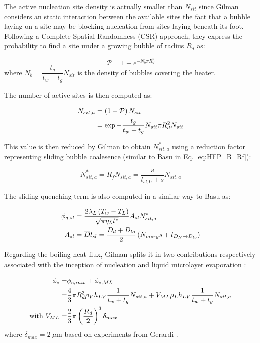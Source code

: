 The active nucleation site density is actually smaller than $N_{sit}$ since Gilman considers an static interaction between the available sites \ie the fact that a bubble laying on a site may be blocking nucleation from sites laying beneath its foot. Following a Complete Spatial Randomness (CSR) approach, they express the probability to find a site under a growing bubble of radius $R_{d}$ as:

\begin{equation}
\mathcal{P} = 1-e^{-N_{b}\pi R_{d}^{2}}
\label{eq:HFP_G_Pinter}
\end{equation} 
where $N_{b} = \dfrac{t_{g}}{t_{w}+t_{g}}N_{sit}$ is the density of bubbles covering the heater.

The number of active sites is then computed as:

\begin{align}
N_{sit,a} &= \parth{1-\mathcal{P}}N_{sit}\\
%
&= \exp{-\dfrac{t_{g}}{t_{w}+t_{g}}N_{sit}\pi R_{d}^{2}} N_{sit}
\label{eq:HFP_G_Nsita}
\end{align}

This value is then reduced by Gilman to obtain $N_{sit,a}^{*}$ using a reduction factor representing sliding bubble coalesence (similar to Basu in Eq. \ref{eq:HFP_B_Rf}):

\begin{equation}
N_{sit,a}^{*}=R_{f}N_{sit,a} = \frac{s}{l_{sl,0}+s} N_{sit,a}
\end{equation}


The sliding quenching term is also computed in a similar way to Basu as:

\begin{align}
\phi_{q,sl}&=\frac{2\lambda_{L}\parth{T_{w}-T_{L}}}{\sqrt{\pi \eta_{L}t^{*}}}A_{sl}N_{sit,a}^{*} \\
%
A_{sl} &= \overline{D}l_{sl} = \frac{D_{d}+D_{lo}}{2}\parth{N_{merg}s+l_{D_{N}\rightarrow D_{lo}}}
\end{align}

Regarding the boiling heat flux, Gilman splits it in two contributions respectively associated with the inception of nucleation and liquid microlayer evaporation :

\begin{align}
\phi_{e} =& \phi_{e,init} + \phi_{e,ML} \\
%
=& \frac{4}{3}\pi R_{d}^{3}\rho_{V} h_{LV} \frac{1}{t_{w}+t_{g}}N_{sit,a} + V_{ML} \rho_{L}h_{LV} \frac{1}{t_{w}+t_{g}}N_{sit,a}\\
\text{with } V_{ML} =& \frac{2}{3}\pi \parth{\frac{R_{d}}{2}}^{3}\delta_{max}
\end{align}
where $\delta_{max}=2\ \mu\text{m}$ based on experiments from Gerardi \cite{Gerardi}.


